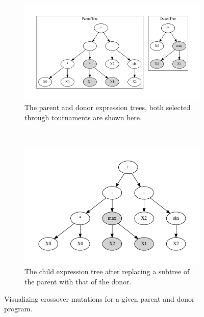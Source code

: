 \begin{figure}[htp]
  \centering
    \begin{subfigure}{\columnwidth}
      \begin{adjustbox}{width=\columnwidth,center}
        \includegraphics{images/graphviz/crossover_before.dot.pdf}
      \end{adjustbox}
      \caption{The parent and donor expression trees, both selected through tournaments are shown here.}
      \label{fig:crossover_muta}
    \end{subfigure}%
    \\
    \begin{subfigure}{\textwidth}
      \centering
      \includegraphics[scale=0.75]{images/graphviz/crossover_after.dot.pdf}
      \caption{The child expression tree after replacing a subtree of the parent with that of the donor.}
      \label{fig:crossover_mutb}
    \end{subfigure}
  \caption{Visualizing crossover mutations for a given parent and donor program.}
  
  \label{fig:crossover}
\end{figure}

